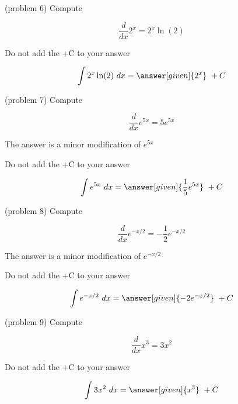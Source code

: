 \documentclass[handout]{ximera}
\begin{document}
\begin{problem}(problem 6)
Compute 

\begin{hint}
\[
\frac{d}{dx} 2^x = 2^x \ln(2)
\]
\end{hint}
\begin{hint}
\begin{center}
Do not add the +C to your answer
\end{center}
\end{hint}

\[
\int 2^x \ln(2) \ dx =
\answer[given]{2^x} \ + C
\]
\end{problem}

\begin{problem}(problem 7)
Compute 

\begin{hint}
\[
\frac{d}{dx} e^{5x} = 5e^{5x}
\]
\end{hint}
\begin{hint}
The answer is a minor modification of $e^{5x}$
\end{hint}
\begin{hint}
\begin{center}
Do not add the +C to your answer
\end{center}
\end{hint}

\[
\int e^{5x} \ dx =
\answer[given]{\frac15 e^{5x}} \ + C
\]
\end{problem}

\begin{problem}(problem 8)
Compute 

\begin{hint}
\[
\frac{d}{dx} e^{-x/2} = -\frac12 e^{-x/2}
\]
\end{hint}
\begin{hint}
The answer is a minor modification of $e^{-x/2}$
\end{hint}
\begin{hint}
\begin{center}
Do not add the +C to your answer
\end{center}
\end{hint}

\[
\int e^{-x/2} \ dx =
\answer[given]{-2 e^{-x/2}} \ + C
\]
\end{problem}



\begin{problem}(problem 9)
Compute 

\begin{hint}
\[
\frac{d}{dx} x^3 = 3x^2
\]
\end{hint}
\begin{hint}
\begin{center}
Do not add the +C to your answer
\end{center}
\end{hint}

\[
\int 3x^2 \ dx =
\answer[given]{x^3} \ + C
\]
\end{problem}
\end{document}
